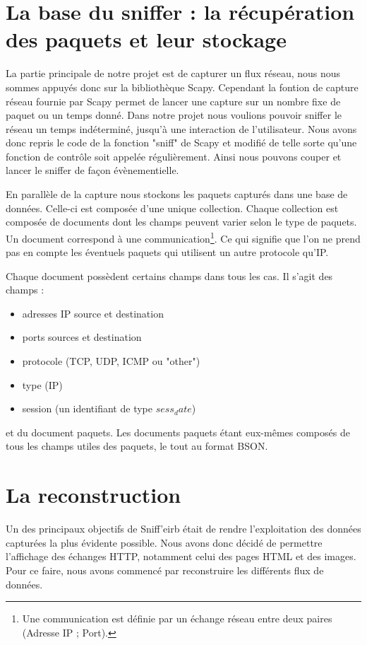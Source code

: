 \section{La base du sniffer : la récupération des paquets et leur stockage}

La partie principale de notre projet est de capturer un flux réseau, nous nous sommes appuyés donc sur la bibliothèque Scapy. Cependant la fontion de capture
réseau fournie par Scapy permet de lancer une capture sur un nombre fixe de paquet ou un temps donné. Dans notre projet nous voulions pouvoir sniffer
le réseau un temps indéterminé, jusqu'à une interaction de l'utilisateur. Nous avons donc repris le code de la fonction "sniff" de Scapy et modifié de telle sorte
qu'une fonction de contrôle soit appelée régulièrement. Ainsi nous pouvons couper et lancer le sniffer de façon évènementielle. 

En parallèle de la capture nous stockons les paquets capturés dans une base de données. Celle-ci est composée d'une unique collection. Chaque collection
est composée de documents dont les champs peuvent varier selon le type de paquets. Un document correspond à une communication\footnote{Une communication est définie par un échange réseau entre deux paires (Adresse IP ; Port).}. Ce qui signifie que l'on ne prend pas en compte les éventuels paquets qui utilisent un autre protocole qu'IP.

Chaque document possèdent certains champs dans tous les cas. Il s'agit des champs :
\begin{itemize}
\item adresses IP source et destination
\item ports sources et destination 
\item protocole (TCP, UDP, ICMP ou "other")
\item type (IP)
\item session (un identifiant de type $sess_date$)
\end{itemize}

et du document paquets.
Les documents paquets étant eux-mêmes composés de tous les champs utiles des paquets, le tout au format BSON.



\section{La reconstruction}

Un des principaux objectifs de Sniff'eirb était de rendre l'exploitation des données capturées la plus évidente possible.
Nous avons donc décidé de permettre l'affichage des échanges HTTP, notamment celui des pages HTML et des images. Pour ce
faire, nous avons commencé par reconstruire les différents flux de données.

